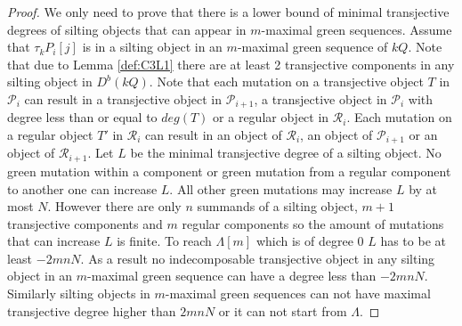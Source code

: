 \begin{proof}
\indent We only need to prove that there is a lower bound of minimal transjective degrees of silting objects that can appear in $m$-maximal green sequences. Assume that $\tau_kP_i[j]$ is in a silting object in an $m$-maximal green sequence of $kQ$. Note that due to Lemma \ref{def:C3L1} there are at least 2 transjective components in any silting object in $D^b(kQ)$. Note that each mutation on a transjective object $T$ in $\mathcal{P}_i$ can result in a transjective object in $\mathcal{P}_{i+1}$, a transjective object in $\mathcal{P}_i$ with degree less than or equal to $deg(T)$ or a regular object in $\mathcal{R}_i$. Each mutation on a regular object $T'$ in $\mathcal{R}_i$ can result in an object of $\mathcal{R}_i$, an object of $\mathcal{P}_{i+1}$ or an object of $\mathcal{R}_{i+1}$. Let $L$ be the minimal transjective degree of a silting object. No green mutation within a component or green mutation from a regular component to another one can increase $L$. All other green mutations may increase $L$ by at most $N$. However there are only $n$ summands of a silting object, $m+1$ transjective components and $m$ regular components so the amount of mutations that can increase $L$ is finite. To reach $\Lambda[m]$ which is of degree 0 $L$ has to be at least $-2mnN$. As a result no indecomposable transjective object in any silting object in an $m$-maximal green sequence can have a degree less than $-2mnN$. Similarly silting objects in $m$-maximal green sequences can not have maximal transjective degree higher than $2mnN$ or it can not start from $\Lambda$.
\end{proof}
